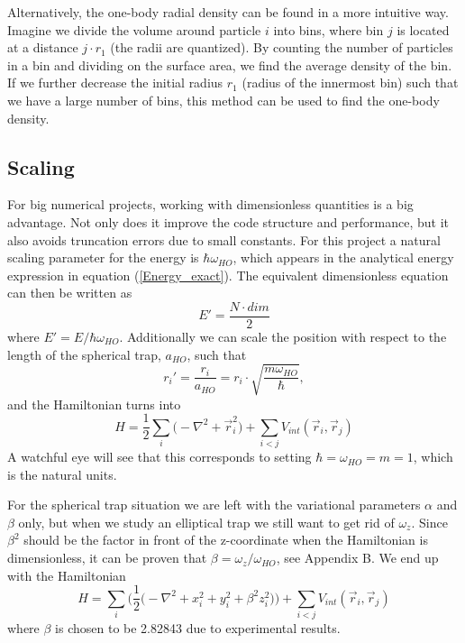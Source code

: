 \documentclass[norsk,a4paper,12pt]{article}
\begin{document}
Alternatively, the one-body radial density can be found in a more intuitive way. Imagine we divide the volume around particle $i$ into bins, where bin $j$ is located at a distance $j\cdot r_1$ (the radii are quantized). By counting the number of particles in a bin and dividing on the surface area, we find the average density of the bin. If we further decrease the initial radius $r_1$ (radius of the innermost bin) such that we have a large number of bins, this method can be used to find the one-body density. 

\subsection{Scaling}
For big numerical projects, working with dimensionless quantities is a big advantage. Not only does it improve the code structure and performance, but it also avoids truncation errors due to small constants. For this project a natural scaling parameter for the energy is $\hbar\omega_{HO}$, which appears in the analytical energy expression in equation (\ref{Energy_exact}). The equivalent dimensionless equation can then be written as
\begin{equation}
E'=\frac{N\cdot dim}{2}
\end{equation}
where $E'=E/\hbar\omega_{HO}$. Additionally we can scale the position with respect to the length of the spherical trap, $a_{HO}$, such that 
\begin{equation}
r_i'=\frac{r_i}{a_{HO}}=r_i\cdot\sqrt{\frac{m\omega_{HO}}{\hbar}},
\end{equation}
and the Hamiltonian turns into
\begin{equation}
H=\frac{1}{2}\sum_i\Big(-\nabla^2 + \vec{r}_i^2\Big)+\sum_{i<j}V_{int}(\vec{r}_i,\vec{r}_j)
\end{equation}
A watchful eye will see that this corresponds to setting $\hbar=\omega_{HO}=m=1$, which is the natural units. 

For the spherical trap situation we are left with the variational parameters $\alpha$ and $\beta$ only, but when we study an elliptical trap we still want to get rid of $\omega_z$. Since $\beta^2$ should be the factor in front of the z-coordinate when the Hamiltonian is dimensionless, it can be proven that $\beta=\omega_z/\omega_{HO}$, see Appendix B. We end up with the Hamiltonian
\begin{equation}
H=\sum_i\bigg(\frac{1}{2}\Big(-\nabla^2 + x_i^2 + y_i^2 + \beta^2z_i^2\Big)\bigg)+\sum_{i<j}V_{int}(\vec{r}_i,\vec{r}_j)
\end{equation} 
where $\beta$ is chosen to be 2.82843 due to experimental results.
\end{document}
